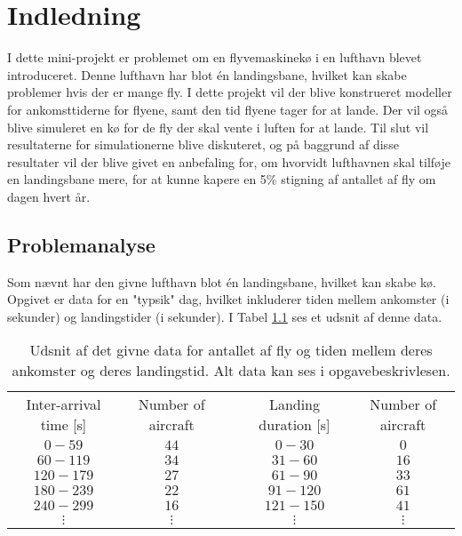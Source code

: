 \chapter{Indledning}
I dette mini-projekt er problemet om en flyvemaskinekø i en lufthavn blevet introduceret.
Denne lufthavn har blot én landingsbane, hvilket kan skabe problemer hvis der er mange fly.
I dette projekt vil der blive konstrueret modeller for ankomsttiderne for flyene, samt den tid flyene tager for at lande.
Der vil også blive simuleret en kø for de fly der skal vente i luften for at lande.
Til slut vil resultaterne for simulationerne blive diskuteret, og på baggrund af disse resultater vil der blive givet en anbefaling for, om hvorvidt lufthavnen skal tilføje en landingsbane mere, for at kunne kapere en 5\% stigning af antallet af fly om dagen hvert år.

\section{Problemanalyse}
Som nævnt har den givne lufthavn blot én landingsbane, hvilket kan skabe kø. Opgivet er data for en "typsik" dag, hvilket inkluderer tiden mellem ankomster (i sekunder) og landingstider (i sekunder).
I Tabel \ref{tabel:intro_data} ses et udsnit af denne data.

\begin{table}[h]
	\centering
	\begin{tabular}{ c c c c c}
		\cline{1-2} \cline{4-5}
		Inter-arrival time [s]	&	Number of aircraft	&	\quad	&	Landing duration [s]	&	Number of aircraft	\\
		\cline{1-2} \cline{4-5}
		$0 - 59$								&	$44$								&				&	$0 - 30$							&	$0$									\\
		$60 - 119$							& $34$								&				&	$31 - 60$							&	$16$								\\
		$120 - 179$							& $27$								&				&	$61 - 90$							&	$33$								\\
		$180 - 239$							&	$22$								&				&	$91 - 120$						&	$61$								\\
		$240 - 299$							& $16$								&				&	$121 - 150$						&	$41$								\\
		$\vdots$								& $\vdots$						&				&	$\vdots$							&	$\vdots$						\\
		\cline{1-2} \cline{4-5}
	\end{tabular}
	\caption{Udsnit af det givne data for antallet af fly og tiden mellem deres ankomster og deres landingstid. Alt data kan ses i opgavebeskrivlesen.} \label{tabel:intro_data}
\end{table}

